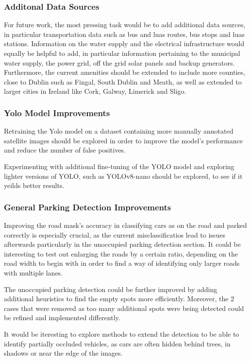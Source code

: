 \subsubsection{Additonal Data Sources}
For future work, the most pressing task would be to add additional data sources,
in particular transportation data such as bus and luas routes, bus stops and
luas stations. Information on the water supply and the electrical infrastructure
would equally be helpful to add, in particular information pertaining to the
municipal water supply, the power grid, off the grid solar panels and backup
generators. Furthermore, the current amenities should be extended to include
more counties, close to Dublin such as Fingal, South Dublin and Meath, as well
as extended to larger cities in Ireland like Cork, Galway, Limerick and Sligo.


\subsubsection{Yolo Model Improvements}
Retraining the Yolo model on a dataset containing more manually annotated
satellite images should be explored in order to improve the model's performance
and reduce the number of false positives.

Experimenting with additional fine-tuning of the YOLO model and exploring lighter 
versions of YOLO, such as YOLOv8-nano should be explored, to see if it yeilds better results.

\subsubsection{General Parking Detection Improvements}

Improving the road mask's accuracy in classifying cars as on the road and parked
correctly is especially crucial, as the current misclassificatios lead to
issues afterwards particularly in the unoccupied parking detection section. It could
be interesting to test out enlarging the roads by a certain ratio, depending on
the road width to begin with in order to find a way of identifying only larger
roads with multiple lanes.

The unoccupied parking detection could be further improved by adding additional
heuristics to find the empty spots more efficiently. Moreover, the 2 cases that
were removed as too many additional spots were being detected could be refined
and implemented differently.

It would be iteresting to explore methods to extend the detection to be able to identify partially 
occluded vehicles, as cars are often hidden behind trees, in shadows or near the edge of the images.
